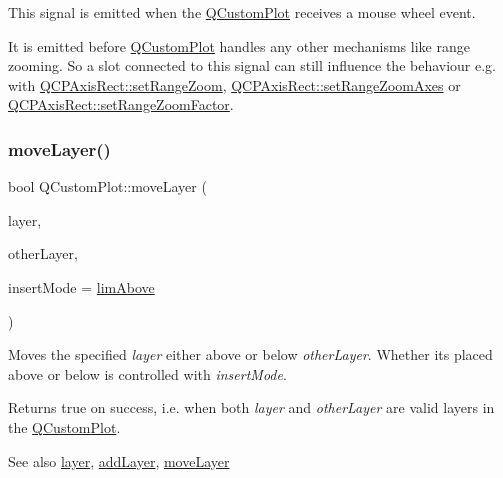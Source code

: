 This signal is emitted when the \mbox{\hyperlink{class_q_custom_plot}{Q\+Custom\+Plot}} receives a mouse wheel event.

It is emitted before \mbox{\hyperlink{class_q_custom_plot}{Q\+Custom\+Plot}} handles any other mechanisms like range zooming. So a slot connected to this signal can still influence the behaviour e.\+g. with \mbox{\hyperlink{class_q_c_p_axis_rect_a7960a9d222f1c31d558b064b60f86a31}{Q\+C\+P\+Axis\+Rect\+::set\+Range\+Zoom}}, \mbox{\hyperlink{class_q_c_p_axis_rect_a9442cca2aa358405f39a64d51eca13d2}{Q\+C\+P\+Axis\+Rect\+::set\+Range\+Zoom\+Axes}} or \mbox{\hyperlink{class_q_c_p_axis_rect_a895d7ac745ea614e04056244b3c138ac}{Q\+C\+P\+Axis\+Rect\+::set\+Range\+Zoom\+Factor}}. \mbox{\label{class_q_custom_plot_ae896140beff19424e9e9e02d6e331104}} 
\subsubsection{\texorpdfstring{move\+Layer()}{moveLayer()}}
{\footnotesize\ttfamily bool Q\+Custom\+Plot\+::move\+Layer (\begin{DoxyParamCaption}\item[{\mbox{\hyperlink{class_q_c_p_layer}{Q\+C\+P\+Layer}} $\ast$}]{layer,  }\item[{\mbox{\hyperlink{class_q_c_p_layer}{Q\+C\+P\+Layer}} $\ast$}]{other\+Layer,  }\item[{\mbox{\hyperlink{class_q_custom_plot_a75a8afbe6ef333b1f3d47abb25b9add7}{Q\+Custom\+Plot\+::\+Layer\+Insert\+Mode}}}]{insert\+Mode = {\ttfamily \mbox{\hyperlink{class_q_custom_plot_a75a8afbe6ef333b1f3d47abb25b9add7a062b0b7825650b432a713c0df6742d41}{lim\+Above}}} }\end{DoxyParamCaption})}

Moves the specified {\itshape layer} either above or below {\itshape other\+Layer}. Whether it\textquotesingle{}s placed above or below is controlled with {\itshape insert\+Mode}.

Returns true on success, i.\+e. when both {\itshape layer} and {\itshape other\+Layer} are valid layers in the \mbox{\hyperlink{class_q_custom_plot}{Q\+Custom\+Plot}}.

\begin{DoxySeeAlso}{See also}
\mbox{\hyperlink{class_q_custom_plot_a0a96244e7773b242ef23c32b7bdfb159}{layer}}, \mbox{\hyperlink{class_q_custom_plot_ad5255393df078448bb6ac83fa5db5f52}{add\+Layer}}, \mbox{\hyperlink{class_q_custom_plot_ae896140beff19424e9e9e02d6e331104}{move\+Layer}} 
\end{DoxySeeAlso}
\mbox{\label{class_q_custom_plot_af1a1f1f571237deb7c2bd34a5e9f018f}} 
